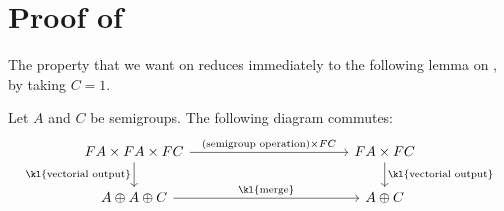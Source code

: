 \section{Proof of }

The property that we want on  reduces immediately to the following lemma on , by taking $C = 1$.

\begin{lemma}\label{lem:merge-middle}
    Let $A$ and $C$ be semigroups. The following diagram commutes:
    \[\begin{tikzcd}
        [column sep=4cm]
        \functor A\times \functor A \times \functor C
        \ar[d,"\text{\kl{vectorial output}}"']
        \ar[r,"(\text{semigroup operation}) \times \functor C"]
        &
        \functor A \times \functor C
        \ar[d,"\text{\kl{vectorial output}}"]
        \\
        A \oplus A \oplus C
        \ar[r,"\text{\kl{merge}}"]
        &
        A \oplus C
    \end{tikzcd}\]
\end{lemma}
